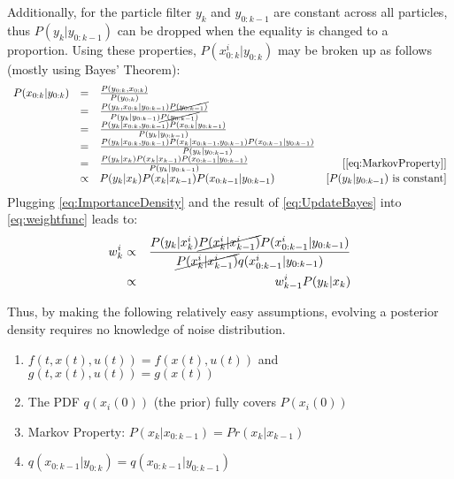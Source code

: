 Additionally, for the particle filter $y_k$ and $y_{0:k-1}$ are 
constant across all particles, thus $P(y_k| y_{0:k-1})$ can
be dropped when the equality is changed to a proportion. 
Using these properties, $P(x^i_{0:k} | y_{0:k})$ may be broken up as follows 
(mostly using Bayes' Theorem):
\begin{equation}
\begin{array}{lclr}
P(x_{0:k} | y_{0:k}) & = & \frac{P(y_{0:k}, x_{0:k})}{P(y_{0:k})} & \\
 & = & \frac{P(y_k, x_{0:k} | y_{0:k-1}) \cancel{P(y_{0:k-1})}}{P(y_k | y_{0:k-1}) \cancel{P(y_{0:k-1})}} & \\
 & = & \frac{P(y_k| x_{0:k}, y_{0:k-1}) P(x_{0:k} | y_{0:k-1})}{P(y_k | y_{0:k-1}) } & \\
 & = & \frac{P(y_k| x_{0:k}, y_{0:k-1}) P(x_k | x_{0:k-1}, y_{0:k-1}) P(x_{0:k-1} | y_{0:k-1})}{P(y_k | y_{0:k-1})} &  \\
& = & \frac{P(y_k| x_k) P(x_k | x_{k-1}) P(x_{0:k-1} | y_{0:k-1})}{P(y_k | y_{0:k-1})}  & [\text{\autoref{eq:MarkovProperty}}]\\
& \propto & P(y_k| x_k) P(x_k | x_{k-1}) P(x_{0:k-1} | y_{0:k-1}) & [P(y_k|y_{0:k-1}) \text{ is constant}]
 \end{array}
 \label{eq:UpdateBayes}
\end{equation}
Plugging \autoref{eq:ImportanceDensity} and the result of \autoref{eq:UpdateBayes}
into \autoref{eq:weightfunc} leads to:
\begin{eqnarray}
w^i_k & \propto & \frac{P(y_k| x^i_k) \cancel{P(x^i_k | x^i_{k-1})} P(x^i_{0:k-1} | y_{0:k-1})}
                         {\cancel{P(x^i_k | x^i_{k-1})}q(x^i_{0:k-1} | y_{0:k-1})} \nonumber \\
& \propto & w^i_{k-1}P(y_k| x_k) 
\label{eq:weightevolve}
\end{eqnarray}

Thus, by making the following relatively easy assumptions, evolving a posterior
density  requires no knowledge of noise distribution.
\begin{enumerate}
\item $f(t, x(t), u(t)) = f(x(t), u(t))$ and $g(t, x(t), u(t)) = g(x(t))$ 
\item The PDF $q(x_i(0))$ (the prior) fully covers $P(x_i(0))$
\item Markov Property: $P(x_k | x_{0:k-1}) = Pr(x_k | x_{k-1})$
\item $q(x_{0:k-1} | y_{0:k}) = q(x_{0:k-1} | y_{0:k-1})$
\end{enumerate}

